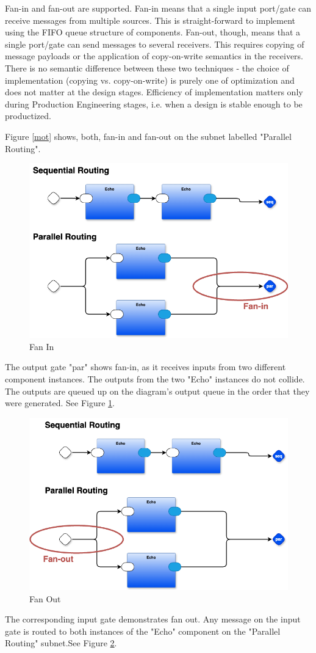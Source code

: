 \documentclass[10pt,anonymous,review]{acmart}
\begin{document}
Fan-in and fan-out are supported. Fan-in means that a single input port/gate can receive messages from multiple sources. This is straight-forward to implement using the FIFO queue structure of components. Fan-out, though, means that a single port/gate can send messages to several receivers. This requires copying of message payloads or the application of copy-on-write semantics in the receivers. There is no semantic difference between these two techniques - the choice of implementation (copying vs. copy-on-write) is purely one of optimization and does not matter at the design stages. Efficiency of implementation matters only during Production Engineering stages, i.e. when a design is stable enough to be productized.

Figure \ref{mot} shows, both, fan-in and fan-out on the subnet labelled "Parallel Routing". 

  \begin{figure}[h]
    \centering
    \includegraphics[width=0.4\linewidth]{./media/fanin.png}
    \caption{Fan In}
    \label{fanin}
  \end{figure}


The output gate "par" shows fan-in, as it receives inputs from two different component instances. The outputs from the two "Echo" instances do not collide. The outputs are queued up on the diagram's output queue in the order that they were generated. See Figure \ref{fanin}.


  \begin{figure}[h]
    \centering
    \includegraphics[width=0.4\linewidth]{./media/fanout.png}
    \caption{Fan Out}
    \label{fanout}
  \end{figure}
The corresponding input gate demonstrates fan out. Any message on the input gate is routed to both instances of the "Echo" component on the "Parallel Routing" subnet.See Figure \ref{fanout}.
\end{document}
